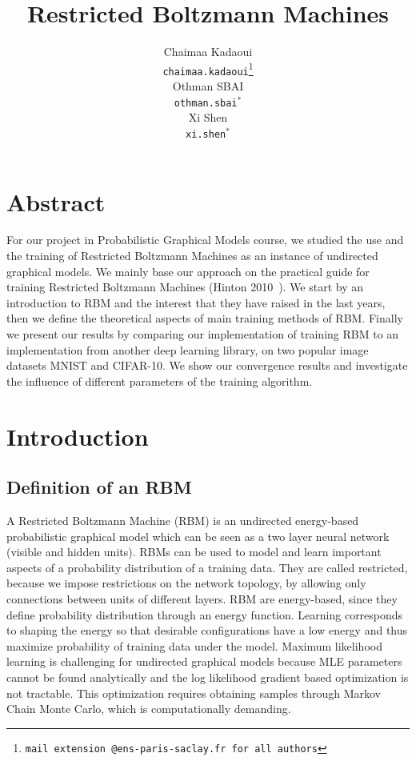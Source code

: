 \documentclass{article}
\title{Restricted Boltzmann Machines}
\author{
  Chaimaa Kadaoui  \\
  \texttt{chaimaa.kadaoui\thanks{mail extension @ens-paris-saclay.fr for all authors}} \\
  \And
  Othman SBAI \\
  \texttt{othman.sbai$^*$} \\
  \And
   Xi Shen\\
  \texttt{xi.shen$^*$} \\
}
\begin{document}
\maketitle
\section{Abstract}
For our project in Probabilistic Graphical Models course, we studied the use and the training of Restricted Boltzmann Machines as an instance of undirected graphical models. We mainly base our approach on the practical guide for training Restricted Boltzmann Machines (Hinton 2010~\cite{hinton2010practical}). We start by an introduction to RBM and the interest that they have raised in the last years, then we define the theoretical aspects of main training methods of RBM. Finally we present our results by comparing our implementation of training RBM to an implementation from another deep learning library, on two popular image datasets MNIST and CIFAR-10. We show our convergence results and investigate the influence of different parameters of the training algorithm.



\section{Introduction}
\subsection{Definition of an RBM}

A Restricted Boltzmann Machine (RBM) is an undirected energy-based probabilistic graphical model which can be seen as a two layer neural network (visible and hidden units). RBMs can be used to model and learn important aspects of a probability distribution of a training data. They are called restricted, because we impose restrictions on the network topology, by allowing only connections between units of different layers. RBM are energy-based, since they define probability distribution through an energy function. Learning corresponds to shaping the energy so that desirable configurations have a low energy and thus maximize probability of training data under the model. Maximum likelihood learning is challenging for undirected graphical models because MLE parameters cannot be found analytically and the log likelihood gradient based optimization is not tractable. This optimization requires obtaining samples through Markov Chain Monte Carlo, which is computationally demanding.
\end{document}
